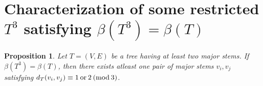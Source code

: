 \documentclass{article}
\newtheorem{prop}[thm]{Proposition}
\theoremstyle{definition}
\numberwithin{equation}{section}
\begin{document}
\section{Characterization of some restricted $T^{3}$ satisfying $\beta{(T^{3})}=\beta{(T)}$}

\begin{prop}\label{pair}
Let $T=(V, E)$ be a tree having at least two major stems. If $\beta{(T^{3})}=\beta{(T)}$, then there exists atleast one pair of major stems $v_{i},v_{j}$ satisfying $d_{T}(v_{i},v_{j})\equiv 1 \hspace{0.2em} \mbox{or} \hspace{0.2em} 2 \hspace{0.2em}( \mbox{mod} \hspace{0.2em} 3)$.
\end{prop}
\end{document}

